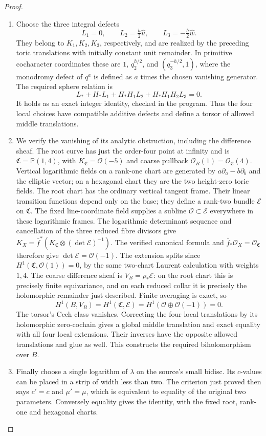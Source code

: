 \begin{proof}
\begin{enumerate}[label={$\langle1\rangle$\arabic*.},leftmargin=*]
\item Choose the three integral defects
\[
 L_1=0,\qquad L_2=\tfrac h2\widehat u,\qquad
 L_3=-\tfrac h2\widehat w.
\]
They belong to $K_1,K_2,K_3$, respectively, and are realized
by the preceding toric translations with initially constant
unit remainder.  In primitive cocharacter coordinates these
are $1$, $q_2^{h/2}$, and $(q_3^{-h/2},1)$, where the
monodromy defect of $q^a$ is defined as $a$ times the chosen
vanishing generator.  The required sphere relation is
\[
 L_*+H_*L_1+H_*H_1L_2+H_*H_1H_2L_3=0.
\]
It holds as an exact integer identity, checked in the program.
Thus the four local choices have compatible additive defects
and define a torsor of allowed middle translations.

\item We verify the vanishing of its analytic obstruction, including
the difference sheaf.  The root curve has just the order-four
point at infinity and is $\mathfrak C=\mathbb P(1,4)$,
with $K_{\mathfrak C}=\mathcal O(-5)$ and coarse pullback
$\mathcal O_B(1)=\mathcal O_{\mathfrak C}(4)$.
Vertical logarithmic fields on a rank-one chart are generated
by $a\partial_a-b\partial_b$ and the elliptic vector;
on a hexagonal chart they are the two height-zero toric fields.
The root chart has the ordinary vertical tangent frame.
Their linear transition functions depend only on the base;
they define a rank-two bundle $\mathcal E$ on $\mathfrak C$.
The fixed line-coordinate field supplies a subline
$\mathcal O\subset\mathcal E$ everywhere in these logarithmic
frames.  The logarithmic determinant sequence and cancellation
of the three reduced fibre divisors give
$K_X=\bar f^*(K_{\mathfrak C}\otimes(\det\mathcal E)^{-1})$.
The verified canonical formula and
$\bar f_*\mathcal O_X=\mathcal O_{\mathfrak C}$ therefore
give $\det\mathcal E=\mathcal O(-1)$.
The extension splits since
$H^1(\mathfrak C,\mathcal O(1))=0$, by the same two-chart
Laurent calculation with weights $1,4$.
The coarse difference sheaf is $V_B=\rho_*\mathcal E$:
on the root chart this is precisely finite equivariance,
and on each reduced collar it is precisely the holomorphic
remainder just described.  Finite averaging is exact, so
\[
 H^1(B,V_B)=H^1(\mathfrak C,\mathcal E)
 =H^1(\mathcal O\oplus\mathcal O(-1))=0.
\]
The torsor's Cech class vanishes.  Correcting the four local
translations by its holomorphic zero-cochain gives a global
middle translation and exact equality with all four local
extensions.  Their inverses have the opposite allowed
translations and glue as well.  This constructs the required
biholomorphism over $B$.

\item Finally choose a single logarithm of $\lambda$ on the source's
small bidisc.  Its $c$-values can be placed in a strip of
width less than two.  The criterion just proved then says
$c'=c$ and $\mu'=\mu$, which is equivalent to equality of
the original two parameters.  Conversely equality gives the
identity, with the fixed root, rank-one and hexagonal charts.

\end{enumerate}
\end{proof}
